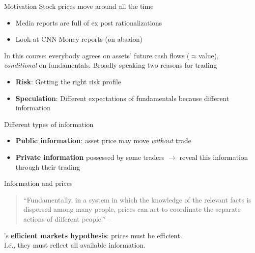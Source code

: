 \begin{frame}{Motivation}
	Stock prices move around all the time
	\begin{itemize}
		\item Media reports are full of ex post rationalizations 
		\item Look at CNN Money reports (on absalon)
	\end{itemize}
	In this course: everybody agrees on assets' future cash flows ($\approx$value), \textit{conditional} on fundamentals. Broadly speaking two reasons for trading
	\begin{itemize}
		\item \textbf{Risk}: Getting the right risk profile
		\item \textbf{Speculation}: Different expectations of fundamentals because different information
	\end{itemize}
	Different types of information
	\begin{itemize}
		\item \textbf{Public information}:  asset price may move \textit{without} trade
		\item \textbf{Private information} possessed by some traders  $\rightarrow$ reveal this information through their trading
	\end{itemize}
\end{frame}


\begin{frame}{Information and prices}
	\begin{quotation}
		``Fundamentally, in a system in which the knowledge of the relevant facts is dispersed among many people, prices can act to coordinate the separate actions of different people.'' -- 
	\end{quotation}

	's \textbf{efficient markets hypothesis}: {prices} must be {efficient}.
	\\
	I.e., they must reflect all available information.
\end{frame}


